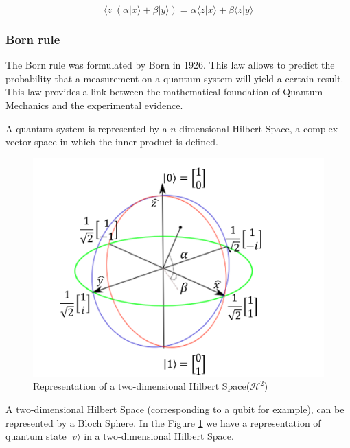  

\begin{equation}
\label{eq_linearity}
\langle z\vert(\alpha\vert x\rangle+\beta\vert y\rangle)=\alpha\langle z\vert x\rangle+\beta\langle z\vert y\rangle
\end{equation}


\subsubsection{Born rule}
\label{subsubsec:bornrule}

The Born rule was formulated by Born in 1926. This law allows to predict the probability that a measurement on a quantum system will yield a certain result. This law provides a link between the mathematical foundation of Quantum Mechanics and the experimental evidence\cite{VanRijsbergen2004}\cite{Landsman2009}. 

A quantum system is represented by a $n$-dimensional Hilbert Space, a complex vector space in which the inner product is defined. 




\begin{figure}[h]
\centering 

\includegraphics[scale=0.35]{Figures/bloch_sphere.png}
\caption{Representation of a two-dimensional Hilbert Space($\mathcal{H}^{2}$)}
\label{fig:circle}
\end{figure}


A two-dimensional Hilbert Space (corresponding to a qubit for example), can be represented by a Bloch Sphere. In the Figure \ref{fig:circle} we have a representation of quantum state $\vert v \rangle$ in a two-dimensional Hilbert Space. 



